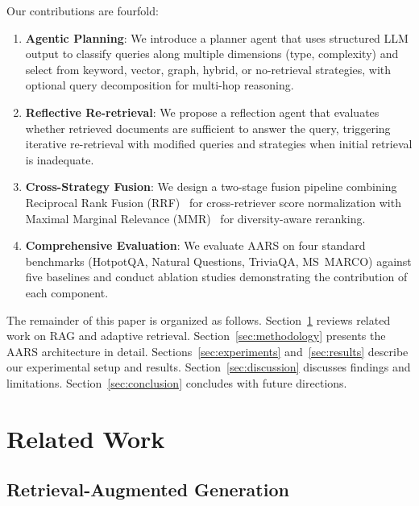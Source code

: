 \documentclass[runningheads]{llncs}
\begin{document}
Our contributions are fourfold:

\begin{enumerate}
    \item \textbf{Agentic Planning}: We introduce a planner agent that uses structured LLM output to classify queries along multiple dimensions (type, complexity) and select from keyword, vector, graph, hybrid, or no-retrieval strategies, with optional query decomposition for multi-hop reasoning.

    \item \textbf{Reflective Re-retrieval}: We propose a reflection agent that evaluates whether retrieved documents are sufficient to answer the query, triggering iterative re-retrieval with modified queries and strategies when initial retrieval is inadequate.

    \item \textbf{Cross-Strategy Fusion}: We design a two-stage fusion pipeline combining Reciprocal Rank Fusion (RRF)~\cite{Cormack2009} for cross-retriever score normalization with Maximal Marginal Relevance (MMR)~\cite{Carbonell1998} for diversity-aware reranking.

    \item \textbf{Comprehensive Evaluation}: We evaluate AARS on four standard benchmarks (HotpotQA, Natural Questions, TriviaQA, MS~MARCO) against five baselines and conduct ablation studies demonstrating the contribution of each component.
\end{enumerate}

The remainder of this paper is organized as follows. Section~\ref{sec:related_work} reviews related work on RAG and adaptive retrieval. Section~\ref{sec:methodology} presents the AARS architecture in detail. Sections~\ref{sec:experiments} and~\ref{sec:results} describe our experimental setup and results. Section~\ref{sec:discussion} discusses findings and limitations. Section~\ref{sec:conclusion} concludes with future directions.

\section{Related Work}
\label{sec:related_work}

\subsection{Retrieval-Augmented Generation}
\end{document}
